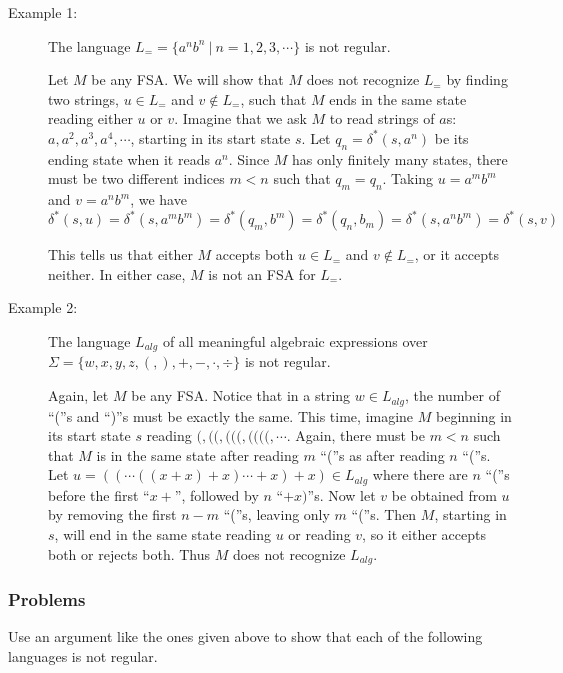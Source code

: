 \documentclass{article}
\begin{document}
\begin{description}

\item[Example 1:] The language $L_= = \{ a^n b^n\ |\ n = 1,2,3,\cdots \}$ is not regular.

  Let $M$ be any FSA. We will show that $M$ does not recognize $L_=$ by finding two strings, $u \in L_=$ and $v \notin L_=$, such that $M$ ends in the same state reading either $u$ or $v$. Imagine that we ask $M$ to read strings of $a$s: $a, a^2, a^3, a^4, \cdots$, starting in its start state $s$. Let $q_n = \delta^*(s,a^n)$ be its ending state when it reads $a^n$. Since $M$ has only finitely many states, there must be two different indices $m < n$ such that $q_m = q_n$. Taking $u = a^m b^m$ and $v = a^n b^m$, we have
  \begin{equation*}
  \delta^*(s,u) = \delta^*(s, a^m b^m) = \delta^*(q_m,b^m) = \delta^*(q_n,b_m) = \delta^*(s, a^n b^m) = \delta^*(s,v)
  \end{equation*}

  This tells us that either $M$ accepts both $u \in L_=$ and $v \notin L_=$, or it accepts neither. In either case, $M$ is not an FSA for $L_=$.

\item[Example 2:] The language $L_{alg}$ of all meaningful algebraic expressions over $\Sigma = \{ w,x,y,z,(,),+,-,\cdot,\div \}$ is not regular.

  Again, let $M$ be any FSA. Notice that in a string $w \in L_{alg}$, the number of ``(''s and ``)''s must be exactly the same. This time, imagine $M$ beginning in its start state $s$ reading $(, ((, (((, ((((, \cdots$. Again, there must be $m < n$ such that $M$ is in the same state after reading $m$ ``(''s as after reading $n$ ``(''s. Let $u = (( \cdots ((x+x)+x) \cdots +x)+x) \in L_{alg}$ where there are $n$ ``(''s before the first ``$x+$'', followed by $n$ ``$+x)$''s. Now let $v$ be obtained from $u$ by removing the first $n-m$ ``(''s, leaving only $m$ ``(''s. Then $M$, starting in $s$, will end in the same state reading $u$ or reading $v$, so it either accepts both or rejects both. Thus $M$ does not recognize $L_{alg}$.

\end{description}


\subsubsection*{Problems}

Use an argument like the ones given above to show that each of the following languages is not regular.
\end{document}
